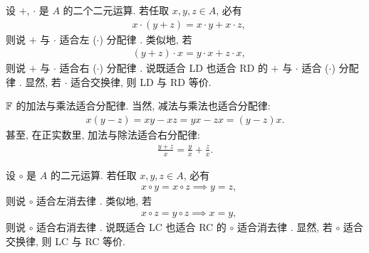 \begin{definition}
    设 $+$, $\cdot$ 是 $A$ 的二个二元运算. 若任取 $x,y,z \in A$, 必有
    \begin{align*}
         & x \cdot (y + z) = x \cdot y + x \cdot z, \tag*{(LD)}
    \end{align*}
    则说 $+$ 与 $\cdot$ 适合左 ($\cdot$) 分配律 . 类似地, 若
    \begin{align*}
         & (y + z) \cdot x = y \cdot x + z \cdot x, \tag*{(RD)}
    \end{align*}
    则说 $+$ 与 $\cdot$ 适合右 ($\cdot$) 分配律 . 说既适合 LD 也适合 RD 的 $+$ 与 $\cdot$ 适合 ($\cdot$) 分配律 . 显然, 若 $\cdot$ 适合交换律, 则 LD 与 RD 等价.
\end{definition}

\begin{example}
    $\mathbb{F}$ 的加法与乘法适合分配律. 当然, 减法与乘法也适合分配律:
    \begin{align*}
        x(y-z) = xy - xz = yx - zx = (y-z)x.
    \end{align*}
    甚至, 在正实数里, 加法与除法适合右分配律:
    \begin{align*}
        \frac{y+z}{x} = \frac{y}{x} + \frac{z}{x}.
    \end{align*}
\end{example}

\begin{definition}
    设 $\circ$ 是 $A$ 的二元运算. 若任取 $x,y,z \in A$, 必有
    \begin{align*}
         & x \circ y = x \circ z \implies y = z, \tag*{(LC)}
    \end{align*}
    则说 $\circ$ 适合左消去律 . 类似地, 若
    \begin{align*}
         & x \circ z = y \circ z \implies x = y, \tag*{(RC)}
    \end{align*}
    则说 $\circ$ 适合右消去律 . 说既适合 LC 也适合 RC 的 $\circ$ 适合消去律 . 显然, 若 $\circ$ 适合交换律, 则 LC 与 RC 等价.
\end{definition}

